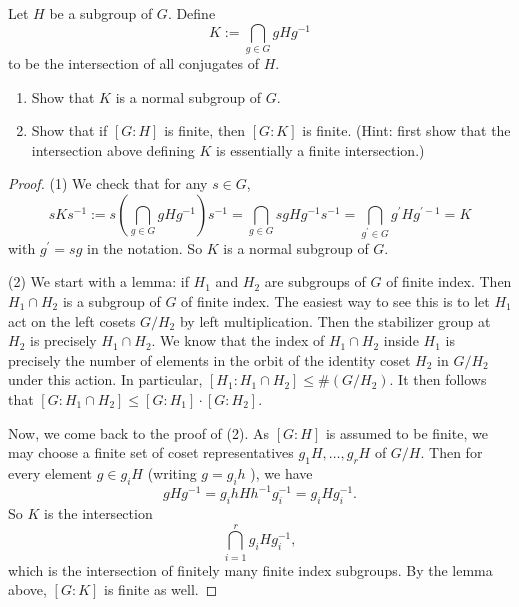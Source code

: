 \begin{definition}
Let $H$ be a subgroup of $G$. Define
\[
K:=\bigcap_{g \in G} g H g^{-1}
\]to be the intersection of all conjugates of $H$.
\end{definition}
\begin{exercise}
\begin{enumerate}
		\item Show that $K$ is a normal subgroup of $G$.
		\item Show that if $[G: H]$ is finite, then $[G: K]$ is finite. (Hint: first show that the intersection above defining $K$ is essentially a finite intersection.)
	\end{enumerate}
\end{exercise}
\begin{proof}
(1) We check that for any $s \in G$,
\[
s K s^{-1}:=s\left(\bigcap_{g \in G} g H g^{-1}\right) s^{-1}=\bigcap_{g \in G} s g H g^{-1} s^{-1}=\bigcap_{g^{\prime} \in G} g^{\prime} H g^{\prime-1}=K
\]
with $g^{\prime}=s g$ in the notation. So $K$ is a normal subgroup of $G$.

(2) We start with a lemma: if $H_1$ and $H_2$ are subgroups of $G$ of finite index. Then $H_1 \cap H_2$ is a subgroup of $G$ of finite index. The easiest way to see this is to let $H_1$ act on the left cosets $G / H_2$ by left multiplication. Then the stabilizer group at $H_2$ is precisely $H_1 \cap H_2$. We know that the index of $H_1 \cap H_2$ inside $H_1$ is precisely the number of elements in the orbit of the identity coset $H_2$ in $G / H_2$ under this action. In particular, $\left[H_1: H_1 \cap H_2\right] \leq \#\left(G / H_2\right)$. It then follows that $\left[G: H_1 \cap H_2\right] \leq\left[G: H_1\right] \cdot\left[G: H_2\right]$.

Now, we come back to the proof of (2). As $[G: H]$ is assumed to be finite, we may choose a finite set of coset representatives $g_1 H, \ldots, g_r H$ of $G / H$. Then for every element $g \in g_i H$ (writing $g=g_i h$ ), we have
\[
g H g^{-1}=g_i h H h^{-1} g_i^{-1}=g_i H g_i^{-1} .
\]
So $K$ is the intersection
\[
\bigcap_{i=1}^r g_i H g_i^{-1},
\]
which is the intersection of finitely many finite index subgroups. By the lemma above, $[G: K]$ is finite as well.
\end{proof}
